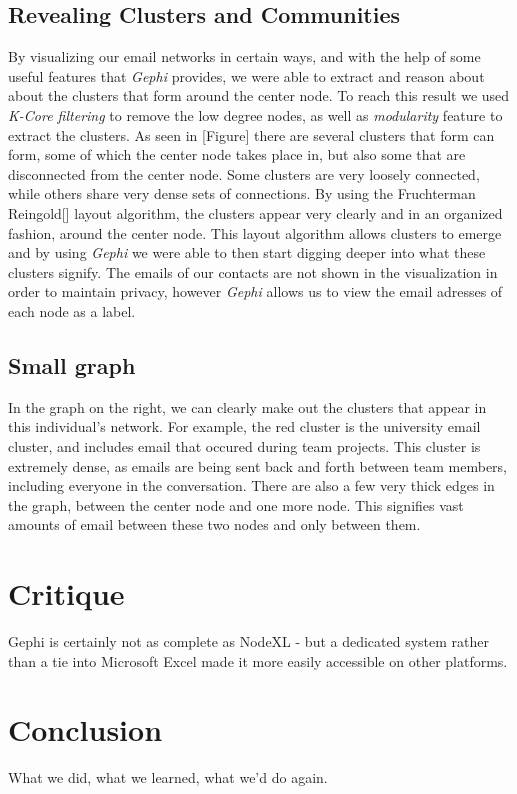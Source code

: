 \documentclass[11pt,letterpaper]{article}
\begin{document}
\subsection*{Revealing Clusters and Communities}

By visualizing our email networks in certain ways, and with the help of some useful features that \textit{Gephi} provides, we were able to extract and reason about about the clusters that form around the center node. To reach this result we used \textit{K-Core filtering} to remove the low degree nodes, as well as \textit{modularity} feature to extract the clusters. As seen in [Figure] there are several clusters that form can form, some of which the center node takes place in, but also some that are disconnected from the center node. Some clusters are very loosely connected, while others share very dense sets of connections. By using the Fruchterman Reingold[] layout algorithm, the clusters appear very clearly and in an organized fashion, around the center node. This layout algorithm allows clusters to emerge and by using \textit{Gephi} we were able to then start digging deeper into what these clusters signify. The emails of our contacts are not shown in the visualization in order to maintain privacy, however \textit{Gephi} allows us to view the email adresses of each node as a label.

\subsection*{Small graph}
In the graph on the right, we can clearly make out the clusters that appear in this individual's network. For example, the red cluster is the university email cluster, and includes email that occured during team projects. This cluster is extremely dense, as emails are being sent back and forth between team members, including everyone in the conversation. There are also a few very thick edges in the graph, between the center node and one more node. This signifies vast amounts of email between these two nodes and only between them.


\section*{Critique}

Gephi is certainly not as complete as NodeXL - but a dedicated system rather than a tie into Microsoft Excel made it more easily accessible on other platforms.

\section*{Conclusion}

What we did, what we learned, what we'd do again.



\end{document}
